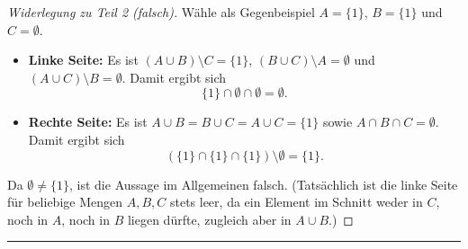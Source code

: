 \begin{proof}[Widerlegung zu Teil 2 (falsch)]
Wähle als Gegenbeispiel $A=\{1\}$, $B=\{1\}$ und $C=\emptyset$.
\begin{itemize}
    \item \textbf{Linke Seite:} Es ist $(A\cup B)\setminus C = \{1\}$, $(B\cup C)\setminus A = \emptyset$ und $(A\cup C)\setminus B = \emptyset$. Damit ergibt sich
    \[
        \{1\}\cap\emptyset\cap\emptyset = \emptyset.
    \]
    \item \textbf{Rechte Seite:} Es ist $A\cup B = B\cup C = A\cup C = \{1\}$ sowie $A\cap B\cap C = \emptyset$. Damit ergibt sich
    \[
        (\{1\}\cap\{1\}\cap\{1\})\setminus\emptyset = \{1\}.
    \]
\end{itemize}
Da $\emptyset\ne\{1\}$, ist die Aussage im Allgemeinen falsch. (Tatsächlich ist die linke Seite für beliebige Mengen $A,B,C$ stets leer, da ein Element im Schnitt weder in $C$, noch in $A$, noch in $B$ liegen dürfte, zugleich aber in $A\cup B$.)
\end{proof}

\vspace{0.8em}
\hrule
\vspace{1em}
